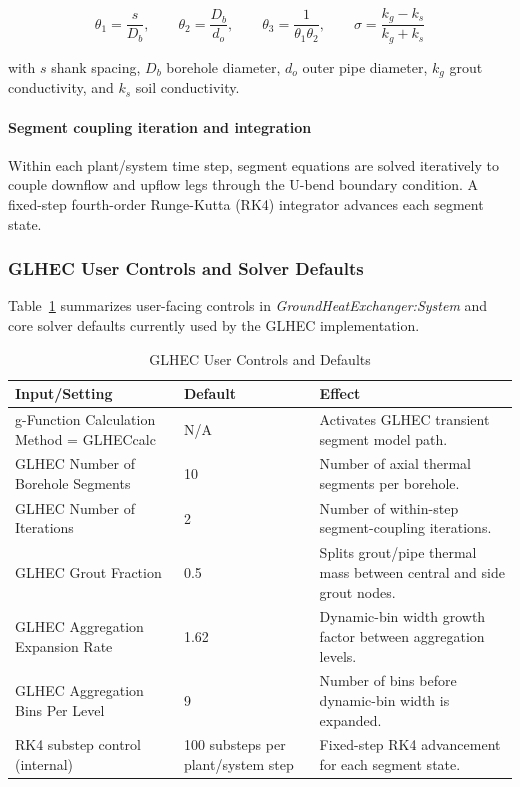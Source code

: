 \begin{equation}
\theta_1 = \frac{s}{D_b}, \qquad \theta_2 = \frac{D_b}{d_o}, \qquad \theta_3 = \frac{1}{\theta_1\theta_2}, \qquad
\sigma = \frac{k_g-k_s}{k_g+k_s}
\end{equation}

with \(s\) shank spacing, \(D_b\) borehole diameter, \(d_o\) outer pipe diameter, \(k_g\) grout conductivity, and \(k_s\) soil conductivity.

\paragraph{Segment coupling iteration and integration}\label{segment-coupling-iteration-and-integration}

Within each plant/system time step, segment equations are solved iteratively to couple downflow and upflow legs through the U-bend boundary condition. A fixed-step fourth-order Runge-Kutta (RK4) integrator advances each segment state.

\subsubsection{GLHEC User Controls and Solver Defaults}\label{glhec-user-controls-and-solver-defaults}

Table~\ref{tab:glhec-user-controls} summarizes user-facing controls in \emph{GroundHeatExchanger:System} and core solver defaults currently used by the GLHEC implementation.

\begin{table}[hbtp]
\centering
\caption{GLHEC User Controls and Defaults\protect\label{tab:glhec-user-controls}}
\begin{tabular}{p{}p{}p{}}
\toprule
\textbf{Input/Setting} & \textbf{Default} & \textbf{Effect} \\
\midrule
g-Function Calculation Method = \mbox{GLHECcalc} & N/A & Activates GLHEC transient segment model path. \\
GLHEC Number of Borehole Segments & 10 & Number of axial thermal segments per borehole. \\
GLHEC Number of Iterations & 2 & Number of within-step segment-coupling iterations. \\
GLHEC Grout Fraction & 0.5 & Splits grout/pipe thermal mass between central and side grout nodes. \\
GLHEC Aggregation Expansion Rate & 1.62 & Dynamic-bin width growth factor between aggregation levels. \\
GLHEC Aggregation Bins Per Level & 9 & Number of bins before dynamic-bin width is expanded. \\
RK4 substep control (internal) & 100 substeps per plant/system step & Fixed-step RK4 advancement for each segment state. \\
\bottomrule
\end{tabular}
\end{table}

